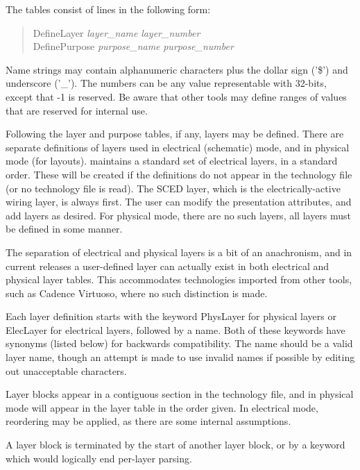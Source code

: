 The tables consist of lines in the following form:
\begin{quote}
{\vt DefineLayer} {\it layer\_name} {\it layer\_number}\\
{\vt DefinePurpose} {\it purpose\_name} {\it purpose\_number}
\end{quote}

Name strings may contain alphanumeric characters plus the dollar sign
('{\vt \$}') and underscore ('{\vt \_}').  The numbers can be any
value representable with 32-bits, except that -1 is reserved.  Be
aware that other tools may define ranges of values that are reserved
for internal use.

Following the layer and purpose tables, if any, {\Xic} layers may be
defined.  There are separate definitions of layers used in electrical
(schematic) mode, and in physical mode (for layouts).  {\Xic}
maintains a standard set of electrical layers, in a standard order. 
These will be created if the definitions do not appear in the
technology file (or no technology file is read).  The SCED layer,
which is the electrically-active wiring layer, is always first.  The
user can modify the presentation attributes, and add layers as
desired.  For physical mode, there are no such layers, all layers must
be defined in some manner.

The separation of electrical and physical layers is a bit of an
anachronism, and in current {\Xic} releases a user-defined layer can
actually exist in both electrical and physical layer tables.  This
accommodates technologies imported from other tools, such as Cadence
Virtuoso, where no such distinction is made.

Each layer definition starts with the keyword {\vt PhysLayer} for
physical layers or {\vt ElecLayer} for electrical layers, followed by
a name.  Both of these keywords have synonyms (listed below) for
backwards compatibility.  The name should be a valid layer name,
though an attempt is made to use invalid names if possible by editing
out unacceptable characters.

Layer blocks appear in a contiguous section in the technology file,
and in physical mode will appear in the layer table in the order
given.  In electrical mode, reordering may be applied, as there are
some internal assumptions.

A layer block is terminated by the start of another layer block, or by
a keyword which would logically end per-layer parsing.

